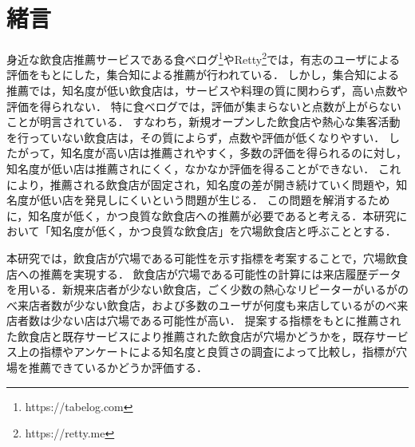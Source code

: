 \chapter{緒言}
\label{chap:intro}
身近な飲食店推薦サービスである食べログ\footnote{https://tabelog.com}やRetty\footnote{https://retty.me}では，有志のユーザによる評価をもとにした，集合知による推薦が行われている．
しかし，集合知による推薦では，知名度が低い飲食店は，サービスや料理の質に関わらず，高い点数や評価を得られない．
特に食べログでは，評価が集まらないと点数が上がらないことが明言されている\cite{score}．
すなわち，新規オープンした飲食店や熱心な集客活動を行っていない飲食店は，その質によらず，点数や評価が低くなりやすい．
したがって，知名度が高い店は推薦されやすく，多数の評価を得られるのに対し，知名度が低い店は推薦されにくく，なかなか評価を得ることができない．
これにより，推薦される飲食店が固定され，知名度の差が開き続けていく問題や，知名度が低い店を発見しにくいという問題が生じる．
この問題を解消するために，知名度が低く，かつ良質な飲食店への推薦が必要であると考える．本研究において「知名度が低く，かつ良質な飲食店」を穴場飲食店と呼ぶこととする．

本研究では，飲食店が穴場である可能性を示す指標を考案することで，穴場飲食店への推薦を実現する．
飲食店が穴場である可能性の計算には来店履歴データを用いる．新規来店者が少ない飲食店，ごく少数の熱心なリピーターがいるがのべ来店者数が少ない飲食店，および多数のユーザが何度も来店しているがのべ来店者数は少ない店は穴場である可能性が高い．
提案する指標をもとに推薦された飲食店と既存サービスにより推薦された飲食店が穴場かどうかを，既存サービス上の指標やアンケートによる知名度と良質さの調査によって比較し，指標が穴場を推薦できているかどうか評価する．
